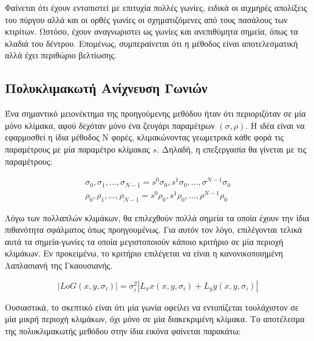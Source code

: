 \documentclass{article}
\begin{document}
Φαίνεται ότι έχουν εντοπιστεί με επιτυχία πολλές γωνίες, ειδικά οι αιχμηρές απολίξεις του πύργου αλλά και οι ορθές γωνίες οι σχηματιζόμενες από τους πασάλους των κτιρίτων. Ωστόσο, έχουν αναγνωριστει ως γωνίες και ανεπιθύμητα σημεία, όπως τα κλαδιά του δέντρου. Επομένως, συμπεραίνεται ότι η μέθοδος είναι αποτελεσματική αλλά έχει περιθώριο βελτίωσης.

\subsection{Πολυκλιμακωτή Ανίχνευση Γωνιών}

Ένα σημαντικό μειονέκτημα της προηγούμενης μεθόδου ήταν ότι περιοριζόταν σε μία μόνο κλίμακα, αφού δεχόταν μόνο ένα ζευγάρι παραμέτρων $(\sigma, \rho)$. Η ιδέα είναι να εφαρμοσθεί η ίδια μέθοδος Ν φορές, κλιμακώνοντας γεωμετρικά κάθε φορά τις παραμέτρους με μία παραμέτρο κλίμακας $s$. Δηλαδή, η επεξεργασία θα γίνεται με τις παραμέτρους:

 \begin{equation}
    \begin{gathered}
        \sigma_0, \sigma_1, ..., \sigma_{N-1} = s^{0}\sigma_0, s^{1}\sigma_0, ..., \sigma^{N-1}\sigma_0 \\
        \rho_0, \rho_1, ..., \rho_{N-1} = s^{0}\rho_0, s^{1}\rho_0, ..., \rho^{N-1}\rho_0 
    \end{gathered}
\end{equation}

Λόγω των πολλαπλών κλιμάκων, θα επιλεχθούν πολλά σημεία τα οποία έχουν την ίδια πιθανότητα σφάλματος όπως προηγουμένως. Για αυτόν τον λόγο, επιλέγονται τελικά αυτά τα σημεία-γωνίες τα οποία μεγιστοποιούν κάποιο κριτήριο σε μία περιοχή κλιμάκων. Εν προκειμένω, το κριτήριο επιλέγεται να είναι η κανονικοποιημένη Λαπλασιανή της Γκαουσιανής.

\begin{equation}
    \left| LoG(x, y, \sigma_i) \right| = \sigma_i^2 \left|L_xx(x,y, \sigma_i) + L_yy(x, y, \sigma_i) \right|
\end{equation}

Ουσιαστικά, το σκεπτικό είναι ότι μία γωνία οφείλει να εντοπίζεται τουλάχιστον σε μία μικρή περιοχή κλιμάκων, όχι μόνο σε μία διακεκριμένη κλίμακα. Το αποτέλεσμα της πολυκλιμακωτής μεθόδου στην ίδια εικόνα φαίνεται παρακάτω:
\end{document}
